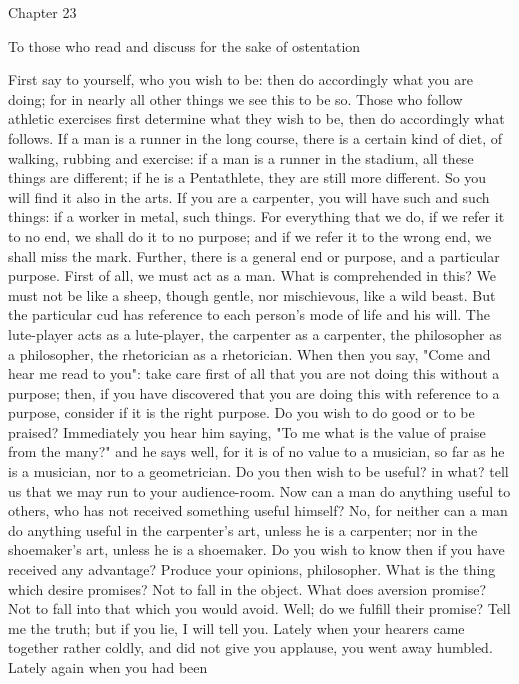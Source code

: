 \documentclass[a4paper]{article}
\begin{document}
Chapter 23

To those who read and discuss for the sake of ostentation

    First say to yourself, who you wish to be: then do accordingly what you are
doing; for in nearly all other things we see this to be so. Those who follow
athletic exercises first determine what they wish to be, then do accordingly
what follows. If a man is a runner in the long course, there is a certain kind
of diet, of walking, rubbing and exercise: if a man is a runner in the stadium,
all these things are different; if he is a Pentathlete, they are still more
different. So you will find it also in the arts. If you are a carpenter, you
will have such and such things: if a worker in metal, such things. For
everything that we do, if we refer it to no end, we shall do it to no purpose;
and if we refer it to the wrong end, we shall miss the mark. Further, there is
a general end or purpose, and a particular purpose. First of all, we must act
as a man. What is comprehended in this? We must not be like a sheep, though
gentle, nor mischievous, like a wild beast. But the particular cud has
reference to each person's mode of life and his will. The lute-player acts as a
lute-player, the carpenter as a carpenter, the philosopher as a philosopher,
the rhetorician as a rhetorician. When then you say, "Come and hear me read to
you": take care first of all that you are not doing this without a purpose;
then, if you have discovered that you are doing this with reference to a
purpose, consider if it is the right purpose. Do you wish to do good or to be
praised? Immediately you hear him saying, "To me what is the value of praise
from the many?" and he says well, for it is of no value to a musician, so far
as he is a musician, nor to a geometrician. Do you then wish to be useful? in
what? tell us that we may run to your audience-room. Now can a man do anything
useful to others, who has not received something useful himself? No, for
neither can a man do anything useful in the carpenter's art, unless he is a
carpenter; nor in the shoemaker's art, unless he is a shoemaker.
    Do you wish to know then if you have received any advantage? Produce your
opinions, philosopher. What is the thing which desire promises? Not to fall in
the object. What does aversion promise? Not to fall into that which you would
avoid. Well; do we fulfill their promise? Tell me the truth; but if you lie, I
will tell you. Lately when your hearers came together rather coldly, and did
not give you applause, you went away humbled. Lately again when you had been
\end{document}
